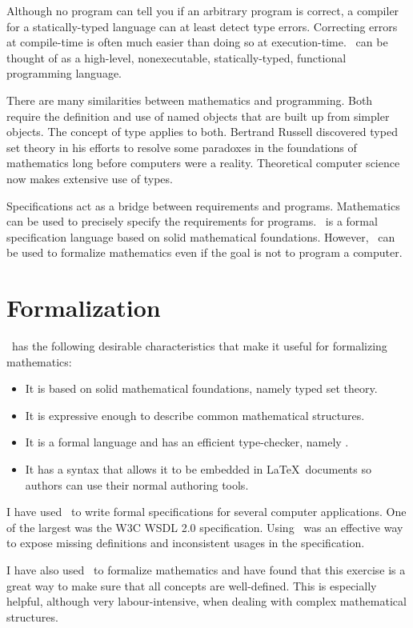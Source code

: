 \documentclass{amsart}
\begin{document}
Although no program can tell you if an arbitrary program is correct, 
a compiler for a statically-typed language can at least detect type errors.
Correcting errors at compile-time is often much easier than doing so at execution-time.
\ZN\ can be thought of as a high-level, nonexecutable, statically-typed, functional programming language.

There are many similarities between mathematics and programming. 
Both require the definition and use of named objects that are built up from simpler objects.
The concept of type applies to both.
Bertrand Russell discovered typed set theory in his efforts to resolve some paradoxes
in the foundations of mathematics 
long before computers were a reality.
Theoretical computer science now makes extensive use of types.

Specifications act as a bridge between requirements and programs.
Mathematics can be used to precisely specify the requirements for programs.
\ZN\ is a formal specification language based on solid mathematical foundations.
However, \ZN\  can be used to formalize mathematics even if the goal is not to program a computer.

\section{Formalization}

\ZN\ has the following desirable characteristics that make it useful for formalizing mathematics:
\begin{itemize}
	\item It is based on solid mathematical foundations, namely typed set theory.
	\item It is expressive enough to describe common mathematical structures.
	\item It is a formal language and has an efficient type-checker, namely \fuzz.
	\item It has a syntax that allows it to be embedded in \LaTeX\ documents so authors can use their
	normal authoring tools.
\end{itemize}

I have used \ZN\ to write formal specifications for several computer applications.
One of the largest was the W3C WSDL 2.0 specification.
Using \ZN\ was an effective way to expose missing definitions and inconsistent usages in the specification.

I have also used \ZN\ to formalize mathematics and have found that this exercise is a great way to make sure 
that all concepts are well-defined.
This is especially helpful, although very labour-intensive, when dealing with complex mathematical structures.
\end{document}
